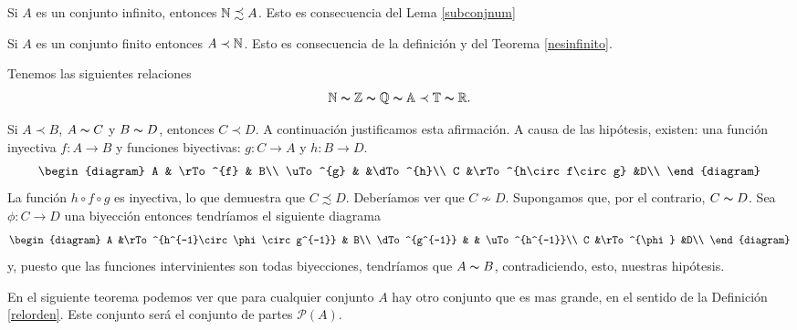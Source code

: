 \begin{ejemplo}{} Si $A$ es un conjunto infinito, entonces
$\mathbb{N}\precsim A $. Esto es consecuencia del Lema \vref{subconjnum}
\end{ejemplo}

\begin{ejemplo}{} Si $A$ es un conjunto finito entonces $A\prec\mathbb{N}$.
Esto es consecuencia de la definición y del Teorema
\vref{nesinfinito}.
\end{ejemplo}

\begin{ejemplo}{} Tenemos las siguientes relaciones
\[\mathbb{N}\thicksim\mathbb{Z}\thicksim\mathbb{Q}\thicksim\mathbb{A}\prec\mathbb{T}\thicksim\mathbb{R}.\]
\end{ejemplo}

\begin{ejemplo}{} Si $A\prec B$, $A\thicksim C$ y
$B\thicksim D$, entonces $C\prec D$. A continuación justificamos esta afirmación. A causa de las
hipótesis, existen: una función inyectiva $f:A\longrightarrow
B$ y funciones biyectivas: $g:C\longrightarrow A$ y
$h:B\longrightarrow D$.
\[
    \begin{diagram}
      A         & \rTo^{f}                  & B\\
       \uTo^{g} &                            &\dTo^{h}\\
       C        &\rTo^{h\circ f\circ g}                    &D\\
       \end{diagram}
       \]
La función $h\circ f \circ g$ es inyectiva, lo que demuestra que
$C\precsim D$. Deberíamos ver que $C\nsim D$. Supongamos que,
por el contrario, $C\thicksim D$. Sea $\phi:C\longrightarrow D$
una biyección entonces tendríamos el siguiente diagrama
\[
    \begin{diagram}
      A             &\rTo^{h^{-1}\circ\phi\circ g^{-1}}     & B\\
      \dTo^{g^{-1}} &                                       & \uTo^{h^{-1}}\\
      C              &\rTo^{\phi}                            &D\\
       \end{diagram}
       \]
y, puesto que las funciones intervinientes son todas biyecciones,
tendríamos que $A\thicksim B$, contradiciendo, esto, nuestras
hipótesis.
\end{ejemplo}

En el siguiente teorema podemos ver que para cualquier conjunto
$A$ hay otro conjunto que es mas grande, en el sentido de la
Definición \vref{relorden}. Este conjunto será el conjunto de
partes $\mathscr{P}(A)$.

